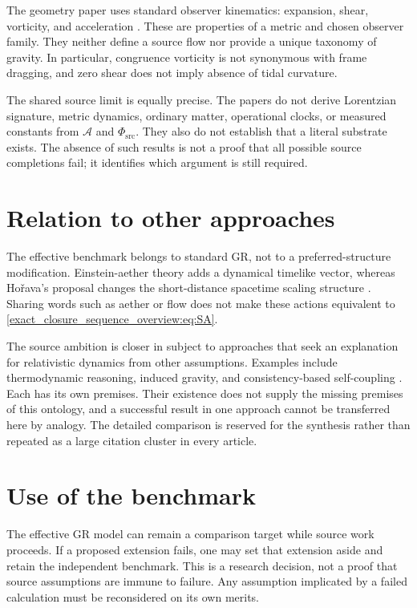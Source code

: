 \documentclass[11pt,oneside]{report}
\newcommand{\Sub}{\mathcal A}
\newcommand{\PhiSrc}{\Phi_{\mathrm{src}}}
\theoremstyle{remark}
\numberwithin{definition}{chapter}
\numberwithin{proposition}{chapter}
\numberwithin{remark}{chapter}
\begin{document}
The geometry paper uses standard observer kinematics: expansion, shear, vorticity, and acceleration \parencite{EllisVanElst1999}. These are properties of a metric and chosen observer family. They neither define a source flow nor provide a unique taxonomy of gravity. In particular, congruence vorticity is not synonymous with frame dragging, and zero shear does not imply absence of tidal curvature.

The shared source limit is equally precise. The papers do not derive Lorentzian signature, metric dynamics, ordinary matter, operational clocks, or measured constants from $\Sub$ and $\PhiSrc$. They also do not establish that a literal substrate exists. The absence of such results is not a proof that all possible source completions fail; it identifies which argument is still required.

\section{Relation to other approaches}
The effective benchmark belongs to standard GR, not to a preferred-structure modification. Einstein-aether theory adds a dynamical timelike vector, whereas Ho\v{r}ava's proposal changes the short-distance spacetime scaling structure \parencite{JacobsonMattingly2001,Horava2009}. Sharing words such as aether or flow does not make these actions equivalent to \eqref{exact_closure_sequence_overview:eq:SA}.

The source ambition is closer in subject to approaches that seek an explanation for relativistic dynamics from other assumptions. Examples include thermodynamic reasoning, induced gravity, and consistency-based self-coupling \parencite{Jacobson1995,Visser2002,Deser2004}. Each has its own premises. Their existence does not supply the missing premises of this ontology, and a successful result in one approach cannot be transferred here by analogy. The detailed comparison is reserved for the synthesis rather than repeated as a large citation cluster in every article.

\section{Use of the benchmark}
The effective GR model can remain a comparison target while source work proceeds. If a proposed extension fails, one may set that extension aside and retain the independent benchmark. This is a research decision, not a proof that source assumptions are immune to failure. Any assumption implicated by a failed calculation must be reconsidered on its own merits.
\end{document}
